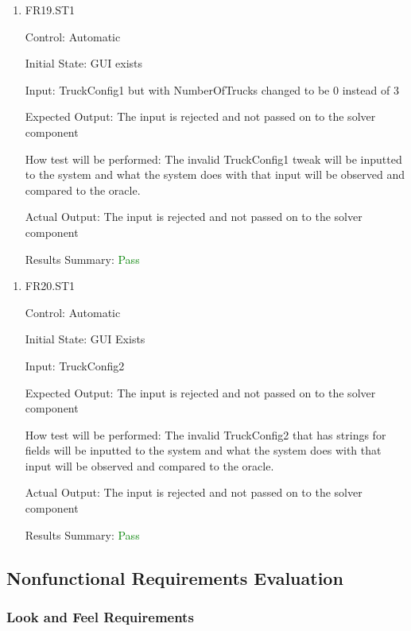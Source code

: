 \documentclass[12pt, titlepage]{article}
\begin{document}
\begin{enumerate}

  \item{FR19.ST1\\}
  
  Control: Automatic
            
  Initial State: GUI exists
            
  Input: TruckConfig1 but with NumberOfTrucks changed to be 0 instead of 3
            
  Expected Output: The input is rejected and not passed on to the solver component
  
  How test will be performed: The invalid TruckConfig1 tweak will be inputted to the system and what the system does with that input will be observed and compared to the oracle.

  Actual Output: The input is rejected and not passed on to the solver component

  Results Summary: \textcolor{green} {Pass}
                
\end{enumerate}
\begin{enumerate}

  \item{FR20.ST1\\}
  
  Control: Automatic
            
  Initial State: GUI Exists
            
  Input: TruckConfig2
            
  Expected Output: The input is rejected and not passed on to the solver component
  
  How test will be performed: The invalid TruckConfig2 that has strings for fields will be inputted to the system and what the system does with that input will be observed and compared to the oracle.

  Actual Output: The input is rejected and not passed on to the solver component

  Results Summary: \textcolor{green} {Pass}
\end{enumerate}   
\subsection{Nonfunctional Requirements Evaluation}

\subsubsection{Look and Feel Requirements}
\end{document}
